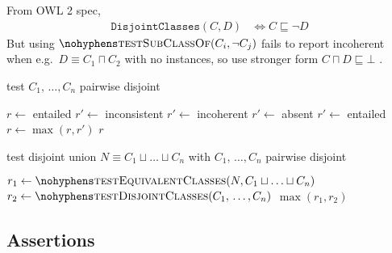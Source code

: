 \documentclass[paper.tex]{subfiles}
\begin{document}
From OWL 2 spec,
\begin{align*}
  \mathtt{DisjointClasses}(C, D)
  &\iff C \sqsubseteq \neg D
\end{align*}
But using $\textproc{testSubClassOf}(C_i, \neg C_j)$ fails to report incoherent when e.g.\ $D \equiv C_1 \sqcap C_2$ with no instances, so use stronger form $C \sqcap D \sqsubseteq \bot$ .

\begin{algorithm}[H]
  \caption{test $C_1, \,\ldots, C_n$ pairwise disjoint}
  \begin{algorithmic}[1]
    \raggedright
      \State $r \gets$ entailed
            \State $r' \gets$ inconsistent
            \State $r' \gets$ incoherent
            \State $r' \gets$ absent
          \Else
            \State $r' \gets$ entailed
          \EndIf
          \State $r \gets \max(r, r')$
        \EndFor
      \EndFor
      \State \Return $r$
    \EndFunction
  \end{algorithmic}
\end{algorithm}

\begin{algorithm}[H]
  \caption{test disjoint union $N \equiv C_1 \sqcup \ldots \sqcup C_n$ with $C_1, \,\ldots, C_n$ pairwise disjoint}
  \begin{algorithmic}[1]
    \raggedright
      \State $r_1 \gets \Call{testEquivalentClasses}{N, C_1 \sqcup \ldots \sqcup C_n}$
      \State $r_2 \gets \Call{testDisjointClasses}{C_1, \,\ldots, C_n}$
      \State \Return $\max(r_1, r_2)$
    \EndFunction
  \end{algorithmic}
\end{algorithm}


\subsection{Assertions}
\label{sec:algorithms:assert}
\end{document}
